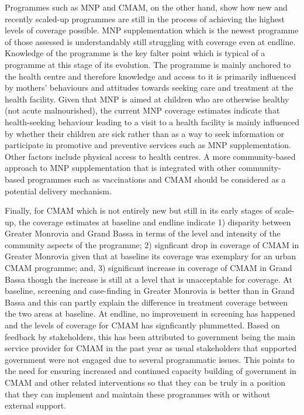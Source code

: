 \documentclass[12pt,a4paper]{article}
\begin{document}
Programmes such as MNP and CMAM, on the other hand, show how new and recently scaled-up programmes are still in the process of achieving the highest levels of coverage possible. MNP supplementation which is the newest programme of those assessed is understandably still struggling with coverage even at endline. Knowledge of the programme is the key falter point which is typical of a programme at this stage of its evolution. The programme is mainly anchored to the health centre and therefore knowledge and access to it is primarily influenced by mothers' behaviours and attitudes towards seeking care and treatment at the health facility. Given that MNP is aimed at children who are otherwise healthy (not acute malnourished), the current MNP coverage estimates indicate that health-seeking behaviour leading to a visit to a health facility is mainly influenced by whether their children are sick rather than as a way to seek information or participate in promotive and preventive services such as MNP supplementation. Other factors include physical access to health centres. A more community-based approach to MNP supplementation that is integrated with other community-based programmes such as vaccinations and CMAM should be considered as a potential delivery mechanism.

Finally, for CMAM which is not entirely new but still in its early stages of scale-up, the coverage estimates at baseline and endline indicate 1) disparity between Greater Monrovia and Grand Bassa in terms of the level and intensity of the community aspects of the programme; 2) signficant drop in coverage of CMAM in Greater Monrovia given that at baseline its coverage was exemplary for an urban CMAM programme; and, 3) significant increase in coverage of CMAM in Grand Bassa though the increase is still at a level that is unacceptable for coverage. At baseline, screening and case-finding in Greater Monrovia is better than in Grand Bassa and this can partly explain the difference in treatment coverage between the two areas at baseline. At endline, no improvement in screening has happened and the levels of coverage for CMAM has signficantly plummetted. Based on feedback by stakeholders, this has been attributed to government being the main service provider for CMAM in the past year as usual stakeholders that supported government were not engaged due to several programmatic issues. This points to the need for ensuring increased and continued capacity building of government in CMAM and other related interventions so that they can be truly in a position that they can implement and maintain these programmes with or without external support.
\end{document}
